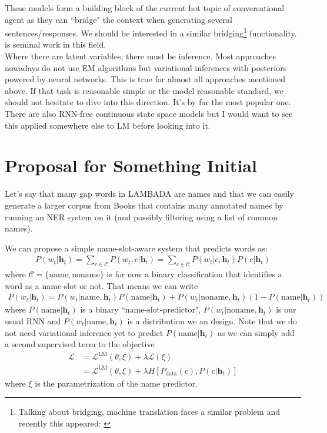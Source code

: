 \documentclass[a4paper,10pt]{article}
\newcommand\h{\mathbf h}
\newcommand\name{\text{name}}
\newcommand\noname{\text{noname}}
\begin{document}
These models form a building block of the current hot topic of conversational agent as they can ``bridge" the context when generating several sentences/responses. We should be interested in a similar bridging\footnote{Talking about bridging, machine translation faces a similar problem and recently this appeared: \cite{wang17}} functionality. \cite{serban16} is seminal work in this field.\\

Where there are latent variables, there must be inference. Most approaches nowadays do not use EM algorithms but variational inferences with posteriors powered by neural networks. This is true for almost all approaches mentioned above. If that task is reasonable simple or the model reasonable standard, we should not hesitate to dive into this direction. It's by far the most popular one.\\

There are also RNN-free continuous state space models \cite{krishnan16} but I would want to see this applied somewhere else to LM before looking into it.

\section{Proposal for Something Initial}
Let's say that many gap words in LAMBADA are names and that we can easily generate a larger corpus from Books that contains many annotated names by running an NER system on it (and possibly filtering using a list of common names).

We can propose a simple name-slot-aware system that predicts words as:
\begin{align}
	P(w_t|\h_t)=\sum_{c\in\mathcal C}P(w_t, c|\h_t)=\sum_{c\in\mathcal C}P(w_t|c, \h_t)P(c|\h_t)
\end{align}
where $\mathcal C=\lbrace\name, \noname \rbrace$ is for now a binary classification that identifies a word as a name-slot or not. That means we can write
\begin{align}
	P(w_t|\h_t)=P(w_t|\name, \h_t)P(\name|\h_t) + P(w_t|\noname, \h_t)(1 - P(\name|\h_t))
\end{align}
where $P(\name|\h_t)$ is a binary ``name-slot-predictor", $P(w_t|\noname, \h_t)$ is our usual RNN and $P(w_t|\name, \h_t)$ is a distribution we an design. Note that we do not need variational inference yet to predict $P(\name|\h_t)$ as we can simply add a second supervised term to the objective
\begin{align}
	\mathcal L&=\mathcal L^\text{LM}(\theta,\xi) + \lambda\mathcal L(\xi)\\
	&=\mathcal L^\text{LM}(\theta,\xi) + \lambda H[P_\text{data}(c), P(c|\h_t)]
\end{align}
where $\xi$ is the parametrization of the name predictor.
\end{document}
